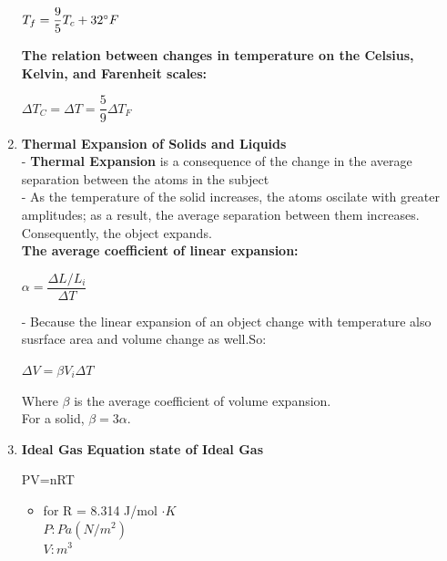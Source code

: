 \documentclass[10pt]{article}
\begin{document}
\begin{enumerate}
	\begin{mybox}
	\begin{center}
	$T_f = \dfrac{9}{5}T_c + 32 \degree F$
	\end{center}
	\end{mybox}
	\textbf{The relation between changes in temperature on the Celsius, Kelvin, and Farenheit scales:}
	\begin{mybox}
	\begin{center}
	$\Delta T_C = \Delta T = \dfrac{5}{9} \Delta T_F$
	\end{center}
	\end{mybox}
	\item \textbf{Thermal Expansion of Solids and Liquids}\\
	- \textbf{Thermal Expansion} is a consequence of the change in the average separation between the atoms in the subject\\ 
	- As the temperature of the solid increases, the atoms oscilate with greater amplitudes; as a result, the average separation between them increases. Consequently, the object expands.\\
	\textbf{The average coefficient of linear expansion:}
	\begin{mybox}
	\begin{center}
	$\alpha = \dfrac{\Delta L / L_i}{\Delta T}$
	\end{center}
	\end{mybox}
	\pagebreak
	- Because the linear expansion of an object change with temperature also susrface area and volume change as well.So:
	\begin{mybox}
	\begin{center}
	$\Delta V = \beta V_i \Delta T$
	\end{center}
	\end{mybox}
	Where $\beta$ is the average coefficient of volume expansion.\\
	For a solid, $\beta = 3 \alpha$.
	\item \textbf{Ideal Gas}
	\textbf{Equation state of Ideal Gas}
	\begin{mybox}
	\begin{center}
	PV=nRT
	\end{center}
	\end{mybox}
	\begin{itemize}
	\item for R = 8.314 J/mol $\cdot K$\\
	 	$P:Pa(N/m^2)$\\
	 	$V:m^3$\\

\end{itemize}
\end{enumerate}
\end{document}
